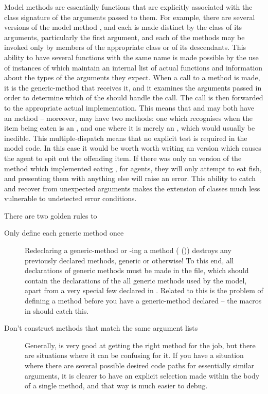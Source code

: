 Model methods are essentially functions that are explicitly associated
with the class signature of the arguments passed to them. For example,
there are several versions of the model method , and each
is made distinct by the class of its arguments, particularly the first
argument, and each of the methods may be invoked only by members of
the appropriate class or of its descendants.  This ability to have
several functions with the same name is made possible by the use of
instances of  which maintain an internal list
of actual functions and information about the types of the arguments
they expect. When a call to a method is made, it is the generic-method
that receives it, and it examines the arguments passed in order to
determine which of the  should handle the call.
The call is then forwarded to the appropriate actual implementation.
This means that and  may both have an
 method -- moreover,  may have two
 methods: one which recognises when the item being eaten
is an , and one where it is merely an ,
which would usually be inedible.  This multiple-dispatch means that no
explicit test is required in the model code.  In this case it would be
worth worth writing an  version which causes the agent
to spit out the offending item.  If there was only an version of
the  method which implemented eating ,
for  agents, they will only attempt to eat fish, and
presenting them with anything else will raise an error.  This ability
to catch and recover from unexpected arguments makes
the extension of classes much less vulnerable to undetected error
conditions. 

There are two golden rules to 
\begin{description}
  \item[Only define each generic method once] Redeclaring a
    generic-method or -ing a method
    (  ()) destroys
    any previously declared  methods, generic or
    otherwise! To this end, all declarations of generic methods must
    be made in the  file, which
    should contain the declarations of the all generic methods used by
    the model, apart from a very special few declared in .
    Related to this is the problem of defining a method
    before you have a generic-method declared -- the macros
    in  should catch this.
    \item[Don't construct methods that match the same argument lists]
    Generally, \SCLOS is very good at getting the right method for the
    job, but there are situations where it can be confusing for it.
    If you have a situation where there are several possible desired
    code paths for essentially similar arguments, it is clearer to
    have an explicit selection made within the body of a single
    method, and that way is much easier to debug.
\end{description}
 
